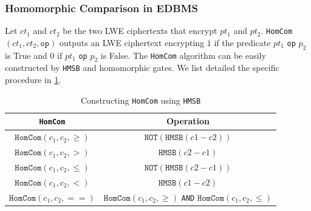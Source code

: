 \subsubsection{Homomorphic Comparison in EDBMS}
Let $ct_1$ and $ct_2$ be the two LWE ciphertexts
that encrypt $pt_1$ and $pt_2$.
\texttt{HomCom}$(ct_1, ct_2, \texttt{op})$ 
outputs an LWE ciphertext encrypting $1$
if the predicate $pt_1$ \texttt{op} $p_2$ is True 
and $0$ if $pt_1$ \texttt{op} $p_2$ is False.
The \texttt{HomCom} algorithm
can be easily constructed by \texttt{HMSB}
and homomorphic gates.
We list detailed the specific procedure in \cref{tab:homcom}.

\begin{table}[htbp] 
    \centering
    \caption{Constructing \texttt{HomCom} using \texttt{HMSB}}
    \vspace{-0.5em}
        \begin{tabular}{cc}
            \toprule
            \texttt{HomCom} & Operation \\
            \midrule
            $\texttt{HomCom}(c_1, c_2, \geq)$ & 
            $\texttt{NOT}(\texttt{HMSB}(c1-c2))$\\
            $\texttt{HomCom}(c_1, c_2, >)$ & 
            $\texttt{HMSB}(c2-c1)$ \\
            $\texttt{HomCom}(c_1, c_2, \leq)$ & 
            $\texttt{NOT}(\texttt{HMSB}(c2-c1))$\\
            $\texttt{HomCom}(c_1, c_2, <)$ & 
            $\texttt{HMSB}(c1-c2)$ \\
            $\texttt{HomCom}(c_1, c_2, ==)$ & 
            $\texttt{HomCom}(c_1, c_2, \geq)$  
            \texttt{AND} $\texttt{HomCom}(c_1, c_2, \leq)$ \\
            
            
            \bottomrule
        \end{tabular}
    \label{tab:homcom}
\end{table}

